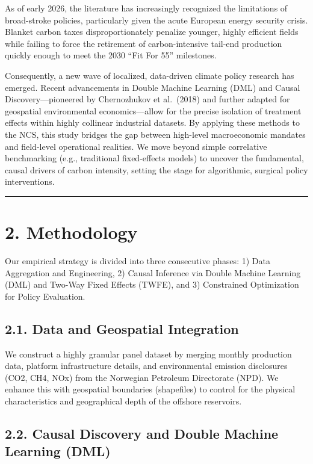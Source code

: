 \documentclass[
  11pt,
]{article}
\begin{document}
As of early 2026, the literature has increasingly recognized the
limitations of broad-stroke policies, particularly given the acute
European energy security crisis. Blanket carbon taxes disproportionately
penalize younger, highly efficient fields while failing to force the
retirement of carbon-intensive tail-end production quickly enough to
meet the 2030 ``Fit For 55'' milestones.

Consequently, a new wave of localized, data-driven climate policy
research has emerged. Recent advancements in Double Machine Learning
(DML) and Causal Discovery---pioneered by Chernozhukov et al.~(2018) and
further adapted for geospatial environmental economics---allow for the
precise isolation of treatment effects within highly collinear
industrial datasets. By applying these methods to the NCS, this study
bridges the gap between high-level macroeconomic mandates and
field-level operational realities. We move beyond simple correlative
benchmarking (e.g., traditional fixed-effects models) to uncover the
fundamental, causal drivers of carbon intensity, setting the stage for
algorithmic, surgical policy interventions.

\begin{center}\rule{0.5\linewidth}{0.5pt}\end{center}

\section{2. Methodology}\label{methodology}

Our empirical strategy is divided into three consecutive phases: 1) Data
Aggregation and Engineering, 2) Causal Inference via Double Machine
Learning (DML) and Two-Way Fixed Effects (TWFE), and 3) Constrained
Optimization for Policy Evaluation.

\subsection{2.1. Data and Geospatial
Integration}\label{data-and-geospatial-integration}

We construct a highly granular panel dataset by merging monthly
production data, platform infrastructure details, and environmental
emission disclosures (CO2, CH4, NOx) from the Norwegian Petroleum
Directorate (NPD). We enhance this with geospatial boundaries
(shapefiles) to control for the physical characteristics and
geographical depth of the offshore reservoirs.

\subsection{2.2. Causal Discovery and Double Machine Learning
(DML)}\label{causal-discovery-and-double-machine-learning-dml}
\end{document}
